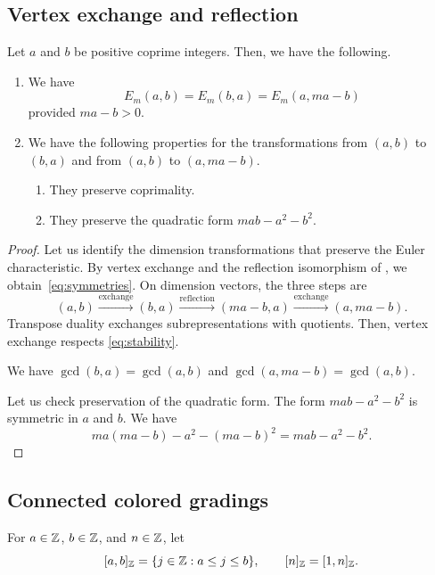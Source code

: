 \subsection{Vertex exchange and reflection}
\begin{lemma}\label{lem:moduli-symmetries}
Let $a$ and $b$ be positive coprime integers.
Then, we have the following.

\begin{enumerate}
\item\label{c:moduli-symmetries-identities} We have
\begin{equation}\label{eq:symmetries}
 E_m(a,b)=E_m(b,a)=E_m(a,ma-b)
\end{equation}
provided $ma-b>0$.
\item\label{c:moduli-symmetries-invariants} We have the following properties for the transformations
from $(a,b)$ to $(b,a)$ and from $(a,b)$ to $(a,ma-b)$.
\begin{enumerate}[label=(\alph*),ref=\theenumi(\alph*)]
\item\label{c:moduli-coprimality} They preserve coprimality.
\item\label{c:moduli-quadratic} They preserve the quadratic form $mab-a^2-b^2$.
\end{enumerate}
\end{enumerate}
\end{lemma}
\begin{proof}
 Let us identify the dimension transformations that preserve the Euler characteristic.
By vertex exchange and the reflection isomorphism of
\cite[Proposition 4.3]{Weist}, we obtain~\eqref{eq:symmetries}.
On dimension vectors, the three steps are
\[
 (a,b)\xrightarrow{\text{exchange}}(b,a)
 \xrightarrow{\text{reflection}}(ma-b,a)
 \xrightarrow{\text{exchange}}(a,ma-b).
\]
Transpose duality exchanges
subrepresentations with quotients. Then, vertex exchange respects
\eqref{eq:stability}.

We have $\gcd(b,a)=\gcd(a,b)$ and $\gcd(a,ma-b)=\gcd(a,b)$.

 Let us check preservation of the quadratic form.
The form $mab-a^2-b^2$ is symmetric in $a$ and $b$. We have
\[
 ma(ma-b)-a^2-(ma-b)^2=mab-a^2-b^2.
\]
\end{proof}

\subsection{Connected colored gradings}
For $a\in\mathbb Z$, $b\in\mathbb Z$, and $n\in\mathbb Z$, let
\[
 [a,b]_{\mathbb Z}=\{j\in\mathbb Z:a\le j\le b\},\qquad [n]_{\mathbb Z}=[1,n]_{\mathbb Z}.
\]

